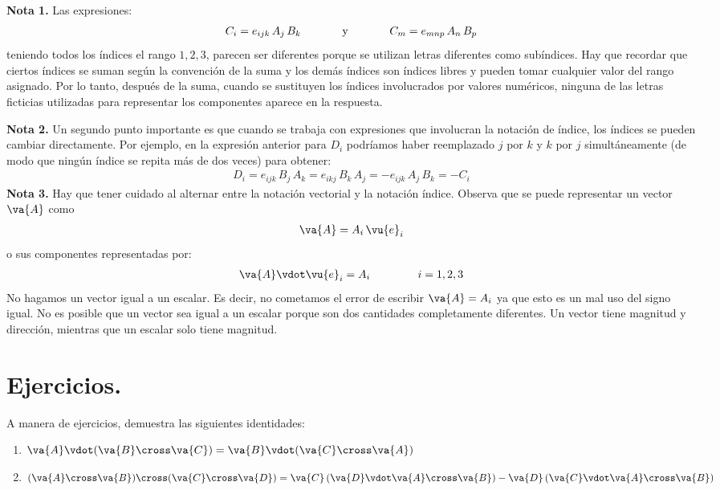 \textbf{Nota 1. } Las expresiones:
\begin{align*}
C_{i} = e_{ijk} \, A_{j} \, B_{k} \hspace{1.3cm} \text{y} \hspace{1.3cm} C_{m} = e_{mnp} \, A_{n} \, B_{p}
\end{align*}
teniendo todos los índices el rango $1, 2, 3$, parecen ser diferentes porque se utilizan letras diferentes como subíndices. Hay que recordar que ciertos índices se suman según la convención de la suma y los demás índices son índices libres y pueden tomar cualquier valor del rango asignado. Por lo tanto, después de la suma, cuando se sustituyen los índices involucrados por valores numéricos, ninguna de las letras ficticias utilizadas para representar los componentes aparece en la respuesta.
\par
\noindent
\textbf{Nota 2. } Un segundo punto importante es que cuando se trabaja con expresiones que involucran la notación de índice, los índices se pueden cambiar directamente. Por ejemplo, en la expresión anterior para $D_{i}$ podríamos haber reemplazado $j$ por $k$ y $k$ por $j$ simultáneamente (de modo que ningún índice se repita más de dos veces) para obtener:
\begin{align*}
D_{i} = e_{ijk} \, B_{j} \, A_{k} = e_{ikj} \, B_{k} \, A_{j} = - e_{ijk} \, A_{j} \, B_{k} = - C_{i}
\end{align*}
\noindent
\textbf{Nota 3. } Hay que tener cuidado al alternar entre la notación vectorial y la notación índice. Observa que se puede representar un vector $\va{A}$ como
\begin{align*}
\va{A} = A_{i} \, \vu{e}_{i}
\end{align*}
o sus componentes representadas por:
\begin{align*}
\va{A} \vdot \vu{e}_{i} = A_{i} \hspace{1.5cm} i = 1, 2, 3
\end{align*}
No hagamos un vector igual a un escalar. Es decir, no cometamos el error de escribir $\va{A} = A_{i}$ ya que esto es un mal uso del signo igual. No es posible que un vector sea igual a un escalar porque son dos cantidades completamente diferentes. Un vector tiene magnitud y dirección, mientras que un escalar solo tiene magnitud.

\section{Ejercicios.}

A manera de ejercicios, demuestra las siguientes identidades:
\begin{enumerate}
\item $\va{A} \vdot (\va{B} \cross \va{C}) = \va{B} \vdot (\va{C} \cross \va{A})$
\item $(\va{A} \cross \va{B}) \cross (\va{C} \cross \va{D}) = \va{C} \, ( \va{D} \vdot \va{A} \cross \va{B}) - \va{D} \, (\va{C} \vdot \va{A} \cross \va{B})$
\end{enumerate}

